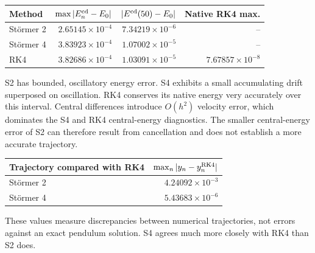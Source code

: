 \documentclass[11pt,a4paper]{article}
\begin{document}
\begin{center}\small
\begin{tabular}{lrrr}
\toprule Method & $\max|E_n^{\rm cd}-E_0|$ & $|E^{\rm cd}(50)-E_0|$ & Native RK4 max. \\ \midrule
St\"ormer 2 & $2.65145\times 10^{-4}$ & $7.34219\times 10^{-6}$ & -- \\
St\"ormer 4 & $3.83923\times 10^{-4}$ & $1.07002\times 10^{-5}$ & -- \\
RK4 & $3.82686\times 10^{-4}$ & $1.03091\times 10^{-5}$ & $7.67857\times 10^{-8}$ \\
\bottomrule
\end{tabular}
\end{center}
S2 has bounded, oscillatory energy error. S4 exhibits a small accumulating drift superposed on oscillation. RK4 conserves its native energy very accurately over this interval. Central differences introduce $O(h^2)$ velocity error, which dominates the S4 and RK4 central-energy diagnostics. The smaller central-energy error of S2 can therefore result from cancellation and does not establish a more accurate trajectory.
\begin{center}\small
\begin{tabular}{lr}
\toprule Trajectory compared with RK4 & $\max_n|y_n-y_n^{\rm RK4}|$ \\ \midrule
St\"ormer 2 & $4.24092\times 10^{-3}$ \\
St\"ormer 4 & $5.43683\times 10^{-6}$ \\
\bottomrule
\end{tabular}
\end{center}
These values measure discrepancies between numerical trajectories, not errors against an exact pendulum solution. S4 agrees much more closely with RK4 than S2 does.
\end{document}
